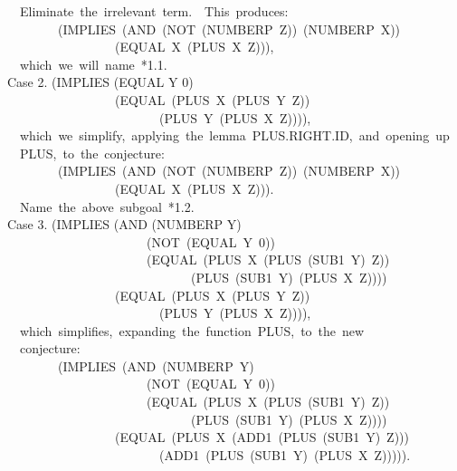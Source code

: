 \documentclass[10pt]{book}
\newenvironment{pubasis}{\begin{flushleft}}{\end{flushleft}}
\begin{document}
\begin{pubasis}
~~Eliminate~the~irrelevant~term.~~This~produces:\\

~~~~~~~~(IMPLIES~(AND~(NOT~(NUMBERP~Z))~(NUMBERP~X))\\
~~~~~~~~~~~~~~~~~(EQUAL~X~(PLUS~X~Z))),\\

~~which~we~will~name~*1.1.\\

Case 2.	(IMPLIES (EQUAL Y 0)\\
~~~~~~~~~~~~~~~~~(EQUAL~(PLUS~X~(PLUS~Y~Z))\\
~~~~~~~~~~~~~~~~~~~~~~~~(PLUS~Y~(PLUS~X~Z)))),\\

~~which~we~simplify,~applying~the~lemma~PLUS.RIGHT.ID,~and~opening~up\\
~~PLUS,~to~the~conjecture:\\

~~~~~~~~(IMPLIES~(AND~(NOT~(NUMBERP~Z))~(NUMBERP~X))\\
~~~~~~~~~~~~~~~~~(EQUAL~X~(PLUS~X~Z))).\\

~~Name~the~above~subgoal~*1.2.\\

Case 3.	(IMPLIES (AND (NUMBERP Y)\\
~~~~~~~~~~~~~~~~~~~~~~(NOT~(EQUAL~Y~0))\\
~~~~~~~~~~~~~~~~~~~~~~(EQUAL~(PLUS~X~(PLUS~(SUB1~Y)~Z))\\
~~~~~~~~~~~~~~~~~~~~~~~~~~~~~(PLUS~(SUB1~Y)~(PLUS~X~Z))))\\
~~~~~~~~~~~~~~~~~(EQUAL~(PLUS~X~(PLUS~Y~Z))\\
~~~~~~~~~~~~~~~~~~~~~~~~(PLUS~Y~(PLUS~X~Z)))),\\

~~which~simplifies,~expanding~the~function~PLUS,~to~the~new\\
~~conjecture:\\

~~~~~~~~(IMPLIES~(AND~(NUMBERP~Y)\\
~~~~~~~~~~~~~~~~~~~~~~(NOT~(EQUAL~Y~0))\\
~~~~~~~~~~~~~~~~~~~~~~(EQUAL~(PLUS~X~(PLUS~(SUB1~Y)~Z))\\
~~~~~~~~~~~~~~~~~~~~~~~~~~~~~(PLUS~(SUB1~Y)~(PLUS~X~Z))))\\
~~~~~~~~~~~~~~~~~(EQUAL~(PLUS~X~(ADD1~(PLUS~(SUB1~Y)~Z)))\\
~~~~~~~~~~~~~~~~~~~~~~~~(ADD1~(PLUS~(SUB1~Y)~(PLUS~X~Z))))).\\


\end{pubasis}
\end{document}
